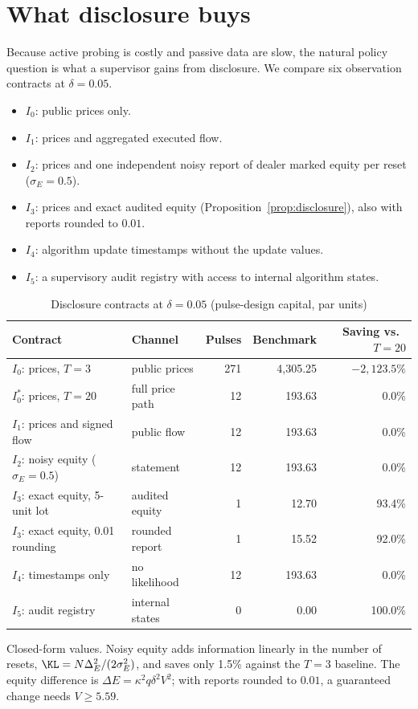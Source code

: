 \section{What disclosure buys}\label{sec:disclosure}

Because active probing is costly and passive data are slow, the natural policy question is what a supervisor gains from disclosure. We compare six observation contracts at $\delta=0.05$.
\begin{itemize}[itemsep=1pt]
\item $I_0$: public prices only.
\item $I_1$: prices and aggregated executed flow.
\item $I_2$: prices and one independent noisy report of dealer marked equity per reset ($\sigma_E=0.5$).
\item $I_3$: prices and exact audited equity (Proposition~\ref{prop:disclosure}), also with reports rounded to $0.01$.
\item $I_4$: algorithm update timestamps without the update values.
\item $I_5$: a supervisory audit registry with access to internal algorithm states.
\end{itemize}

\begin{table}[t]\centering\small
\begin{threeparttable}
\caption{Disclosure contracts at $\delta=0.05$ (pulse-design capital, par units)}\label{tab:contracts}
\begin{tabular}{llrrr}
\toprule
Contract & Channel & Pulses & Benchmark & Saving vs.\ $T=20$\\
\midrule
$I_0$: prices, $T=3$ & public prices & 271 & 4{,}305.25 & $-2{,}123.5\%$\\
$I_0^*$: prices, $T=20$ & full price path & 12 & 193.63 & 0.0\%\\
$I_1$: prices and signed flow & public flow & 12 & 193.63 & 0.0\%\\
$I_2$: noisy equity ($\sigma_E=0.5$) & statement & 12 & 193.63 & 0.0\%\\
$I_3$: exact equity, 5-unit lot & audited equity & 1 & 12.70 & 93.4\%\\
$I_3$: exact equity, 0.01 rounding & rounded report & 1 & 15.52 & 92.0\%\\
$I_4$: timestamps only & no likelihood & 12 & 193.63 & 0.0\%\\
$I_5$: audit registry & internal states & 0 & 0.00 & 100.0\%\\
\bottomrule
\end{tabular}
\begin{tablenotes}\footnotesize\item Closed-form values. Noisy equity adds information linearly in the number of resets, $\KL=N\Delta_E^2/(2\sigma_E^2)$, and saves only 1.5\% against the $T=3$ baseline. The equity difference is $\Delta E=\kappa^2q\delta^2V^2$; with reports rounded to $0.01$, a guaranteed change needs $V\ge5.59$.\end{tablenotes}
\end{threeparttable}
\end{table}

